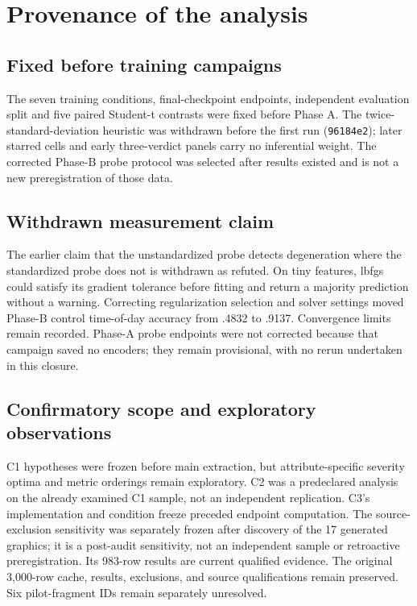 \section{Provenance of the analysis}
\label{sec:provenance}

\subsection{Fixed before training campaigns}
\ours{} The seven training conditions, final-checkpoint endpoints, independent
evaluation split and five paired Student-t contrasts were fixed before Phase A.
The twice-standard-deviation heuristic was withdrawn before the first run
(\texttt{96184e2}); later starred cells and early three-verdict panels carry no
inferential weight. The corrected Phase-B probe protocol was selected after
results existed and is not a new preregistration of those data.

\subsection{Withdrawn measurement claim}
\ours{} The earlier claim that the unstandardized probe detects degeneration
where the standardized probe does not is withdrawn as refuted. On tiny features,
lbfgs could satisfy its gradient tolerance before fitting and return a majority
prediction without a warning. Correcting regularization selection and solver
settings moved Phase-B control time-of-day accuracy from .4832 to .9137.
Convergence limits remain recorded. Phase-A probe endpoints were not corrected
because that campaign saved no encoders; they remain provisional, with no rerun
undertaken in this closure.

\subsection{Confirmatory scope and exploratory observations}
\ours{} C1 hypotheses were frozen before main extraction, but attribute-specific
severity optima and metric orderings remain exploratory. C2 was a predeclared
analysis on the already examined C1 sample, not an independent replication.
C3's implementation and condition freeze preceded endpoint computation.
The source-exclusion sensitivity was separately frozen after discovery of the
17 generated graphics; it is a post-audit sensitivity, not an independent sample
or retroactive preregistration. Its 983-row results are current qualified evidence.
The original 3,000-row cache, results, exclusions, and source qualifications remain
preserved. Six pilot-fragment IDs remain separately unresolved.

